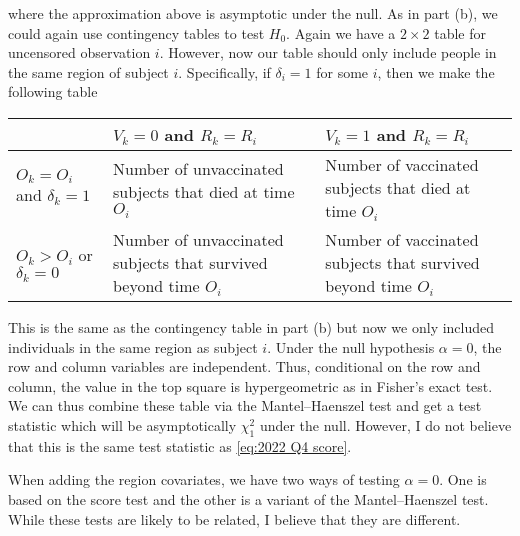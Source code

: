 \begin{enumerate}[label=(\alph*)]
    where the approximation above is asymptotic under the null.  As in part (b), we could again use contingency tables to test $H_0$. Again we have a $2 \times 2$ table for uncensored observation $i$. However, now our table should only include people in the same region of subject $i$. Specifically, if $\delta_i=1$ for some $i$, then we make the following table
    \begin{table}[h]
        \begin{center}
        \begin{tabular}{|p{2.5cm}|p{5cm}|p{5cm}|}
            \hline
         &$V_k=0$ and $R_k=R_i$ & $V_k=1$ and $R_k=R_i$ \\
         \hline 
        $O_k=O_i$ and $\delta_k=1$ & Number of unvaccinated subjects that died at time $O_i$ & Number of vaccinated subjects that died at time $O_i$\\ 
        \hline 
        $O_k > O_i$ or $\delta_k = 0$& Number of unvaccinated subjects that survived beyond time $O_i$ & Number of vaccinated subjects that survived beyond time $O_i$ \\
        \hline 
        \end{tabular}
    \end{center}
    \end{table}
    This is the same as the contingency table in part (b) but now we only included individuals in the same region as subject $i$. Under the null hypothesis $\alpha = 0$, the row and column variables are independent. Thus, conditional on the row and column, the value in the top square is hypergeometric as in Fisher's exact test. We can thus combine these table via the Mantel--Haenszel test and get a test statistic which will be asymptotically $\chi^2_1$ under the null. However, I do not believe that this is the same test statistic as \eqref{eq:2022 Q4 score}.
    
    When adding the region covariates, we have two ways of testing $\alpha = 0$. One is based on the score test and the other is a variant of the Mantel--Haenszel test. While these tests are likely to be related, I believe that they are different. 
\end{enumerate}